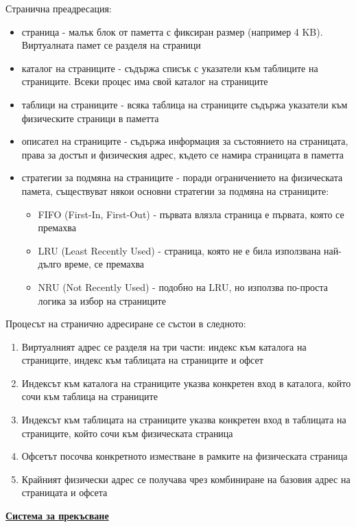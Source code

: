 \documentclass{article}
\begin{document}
Странична преадресация:
\begin{itemize}
    \item страница - малък блок от паметта с фиксиран размер (например 4 KB). Виртуалната памет се разделя на страници
    \item каталог на страниците - съдържа списък с указатели към таблиците на страниците. Всеки процес има свой каталог на страниците
    \item таблици на страниците - всяка таблица на страниците съдържа указатели към физическите страници в паметта
    \item описател на страниците - съдържа информация за състоянието на страницата, права за достъп и физическия адрес, където се намира
    страницата в паметта
    \item стратегии за подмяна на страниците - поради ограничението на физическата памета, съществуват някои основни стратегии за подмяна
    на страниците:
    \begin{itemize}
        \item FIFO (First-In, First-Out) - първата влязла страница е първата, която се премахва
        \item LRU (Least Recently Used) - страница, която не е била използвана най-дълго време, се премахва
        \item NRU (Not Recently Used) - подобно на LRU, но използва по-проста логика за избор на страниците
    \end{itemize}
\end{itemize}
Процесът на странично адресиране се състои в следното:
\begin{enumerate}
    \item Виртуалният адрес се разделя на три части: индекс към каталога на страниците, индекс към таблицата на страниците и офсет
    \item Индексът към каталога на страниците указва конкретен вход в каталога, който сочи към таблица на страниците
    \item Индексът към таблицата на страниците указва конкретен вход в таблицата на страниците, който сочи към физическата страница
    \item Офсетът посочва конкретното изместване в рамките на физическата страница
    \item Крайният физически адрес се получава чрез комбиниране на базовия адрес на страницата и офсета
\end{enumerate}
\textbf{\underline{Система за прекъсване}} \newline\newline
\end{document}
